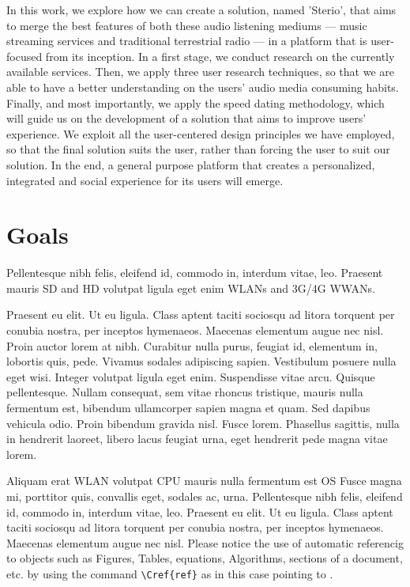 In this work, we explore how we can create a solution, named 'Sterio', that aims to merge the best features of both these audio listening mediums — music streaming services and traditional terrestrial radio  — in a platform that is user-focused from its inception. In a first stage, we conduct research on the currently available services. Then, we apply three user research techniques, so that we are able to have a better understanding on the users' audio media consuming habits. Finally, and most importantly, we apply the speed dating methodology, which will guide us on the development of a solution that aims to improve users' experience. We exploit all the user-centered design principles we have employed, so that the final solution suits the user, rather than forcing the user to suit our solution. In the end, a general purpose platform that creates a personalized, integrated and social experience for its users will emerge. 
\section{Goals}
Pellentesque nibh felis, eleifend id, commodo in, interdum vitae, leo. 
 Praesent mauris \ac{SD} and \ac{HD} volutpat ligula eget enim \acp{WLAN} and 3G\slash 4G \acp{WWAN}.

Praesent eu elit. Ut eu ligula. Class aptent taciti sociosqu ad litora torquent per conubia nostra, per inceptos hymenaeos. Maecenas elementum augue nec nisl. Proin auctor lorem at nibh. Curabitur nulla purus, feugiat id, elementum in, lobortis quis, pede. Vivamus sodales adipiscing sapien. Vestibulum posuere nulla eget wisi. Integer volutpat ligula eget enim. Suspendisse vitae arcu. Quisque pellentesque. Nullam consequat, sem vitae rhoncus tristique, mauris nulla fermentum est, bibendum ullamcorper sapien magna et quam. Sed dapibus vehicula odio. Proin bibendum gravida nisl. Fusce lorem. Phasellus sagittis, nulla in hendrerit laoreet, libero lacus feugiat urna, eget hendrerit pede magna vitae lorem. 
 
Aliquam erat \ac{WLAN} volutpat \ac{CPU} mauris nulla fermentum est \ac{OS} Fusce magna mi, porttitor quis, convallis eget, sodales ac, urna.
Pellentesque nibh felis, eleifend id, commodo in, interdum vitae, leo. Praesent eu elit. Ut eu ligula. Class aptent taciti sociosqu ad litora torquent per conubia nostra, per inceptos hymenaeos. Maecenas elementum augue nec nisl. Please notice the use of automatic referencig to objects such as Figures, Tables, equations, Algorithms, sections of a document, etc. by using the command \verb:\Cref{ref}: as in this case pointing to .

